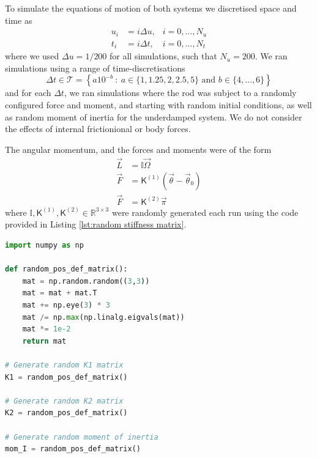 \documentclass[]{cam-thesis}
\begin{document}
To simulate the equations of motion of both systems we discretised space and time as
\begin{subequations}
	\begin{align} 
		u_i  & = i \Delta u, & i=0, \dots, N_u  \\
		t_i & = i \Delta t, & i=0, \dots, N_t
	\end{align}
\end{subequations}
where we used $\Delta u = 1/200$ for all simulations, such that $N_u = 200$. We ran simulations using a range of time-discretisations
\begin{equation} \label{eq:cosserat dts}
	\Delta t \in \mathcal{T} = \left\{ a 10^{-b}\ :\ a \in \{1, 1.25, 2, 2.5, 5 \} \text{ and } b \in \{ 4, \dots, 6 \} \right\}
\end{equation}
and for each $\Delta t$, we ran simulations where the rod was subject to a randomly configured force and moment, and starting with random initial conditions, as well as random moment of inertia for the underdamped system. We do not consider  the effects of internal frictionional or body forces.

The angular momentum, and the forces and moments were of the form
\begin{subequations}
	\begin{align}
		\vec{L} & = \mathbb{I} \vec{\Omega} \\
		\vec{F} & = \mathsf{K}^{(1)} (\vec{\theta} - \vec{\theta}_0) \\
		\vec{F} & = \mathsf{K}^{(2)} \vec{\pi}
	\end{align}
\end{subequations}
where $\mathbb{I}, \mathsf{K}^{(1)}, \mathsf{K}^{(2)} \in \mathbb{R}^{3 \times 3}$ were randomly generated each run using the code provided in Listing \ref{lst:random stiffness matrix}.

\lstset{basicstyle=\footnotesize\ttfamily,breaklines=true}
\lstset{framextopmargin=50pt,frame=bottomline}

\begin{lstlisting}[language=Python, caption=Generating random stiffness matrices and moment of inertia., label={lst:random stiffness matrix}]
import numpy as np
    
def random_pos_def_matrix():
    mat = np.random.random((3,3))
    mat = mat + mat.T
    mat += np.eye(3) * 3
    mat /= np.max(np.linalg.eigvals(mat))
    mat *= 1e-2
    return mat
    
# Generate random K1 matrix
K1 = random_pos_def_matrix()

# Generate random K2 matrix
K2 = random_pos_def_matrix()

# Generate random moment of inertia
mom_I = random_pos_def_matrix()
\end{lstlisting}
\end{document}
